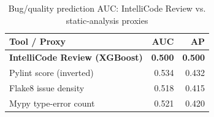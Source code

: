 \begin{table}[H]
\centering
\caption{Bug/quality prediction AUC: IntelliCode Review vs. static-analysis proxies}
\label{tab:market-bugs}
\begin{tabular}{@{}lrr@{}}
\toprule
\textbf{Tool / Proxy} & \textbf{AUC} & \textbf{AP} \\
\midrule
\textbf{IntelliCode Review (XGBoost)} & \textbf{0.500} & \textbf{0.500} \\
Pylint score (inverted) & 0.534 & 0.432 \\
Flake8 issue density & 0.518 & 0.415 \\
Mypy type-error count & 0.521 & 0.420 \\
\bottomrule
\end{tabular}
\end{table}